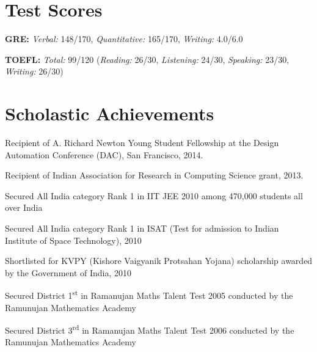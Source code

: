 \documentclass[margin,line]{resume}
\begin{document}
\begin{resume}
    

\section{\mysidestyle Test Scores}
\begin{list1}  
\item \textbf{GRE:} \textit{Verbal:} 148/170, \textit{Quantitative:} 165/170, \textit{Writing:} 4.0/6.0
\item \textbf{TOEFL:} \textit{Total:} 99/120 (\textit{Reading:} 26/30, \textit{Listening:} 24/30, \textit{Speaking:} 23/30, \textit{Writing:} 26/30)
\end{list1}


\section{\mysidestyle Scholastic Achievements}
\begin{list1}
\item Recipient of A. Richard Newton Young Student Fellowship at the Design Automation Conference (DAC), San Francisco, 2014.
\item Recipient of Indian Association for Research in Computing Science grant, 2013.
\item Secured All India category Rank 1 in IIT JEE 2010 among 470,000 students all over India
\item Secured All India category Rank 1 in ISAT (Test for admission to Indian Institute of Space Technology), 2010
\item Shortlisted for KVPY (Kishore Vaigyanik Protsahan Yojana) scholarship awarded by the Government of India, 2010
\item Secured District 1\textsuperscript{st} in Ramanujan Maths Talent Test 2005 conducted by the Ramunujan Mathematics Academy
\item Secured District 3\textsuperscript{rd} in Ramanujan Maths Talent Test 2006 conducted by the Ramunujan Mathematics Academy
\end{list1}

\pagebreak



\end{resume}
\end{document}
